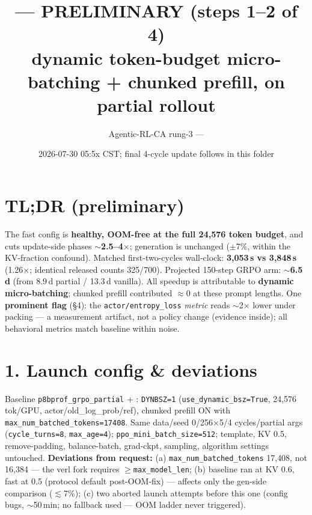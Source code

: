 \documentclass[10pt]{article}
\title{\vspace{-1.4em}\code{p8bprof\_grpo\_fast} --- PRELIMINARY (steps 1--2 of 4)\\
\large dynamic token-budget micro-batching + chunked prefill, on partial rollout\vspace{-0.5em}}
\author{Agentic-RL-CA rung-3 --- \code{sync-partial-rollout-poc}}
\date{2026-07-30 05:5x CST; final 4-cycle update follows in this folder}
\newcommand{\code}[1]{\texttt{\small #1}}
\newcommand{\flag}[1]{\textcolor{red!70!black}{\textbf{#1}}}
\begin{document}
\maketitle\vspace{-1.8em}

\section*{TL;DR (preliminary)}
The fast config is \textbf{healthy, OOM-free at the full 24{,}576 token budget}, and cuts
update-side phases $\sim$\textbf{2.5--4$\times$}; generation is unchanged ($\pm$7\%, within the
KV-fraction confound). Matched first-two-cycles wall-clock: \textbf{3{,}053\,s vs 3{,}848\,s}
(1.26$\times$; identical released counts 325/700). Projected 150-step GRPO arm:
\textbf{$\sim$6.5\,d} (from 8.9\,d partial / 13.3\,d vanilla). All speedup is attributable to
\textbf{dynamic micro-batching}; chunked prefill contributed $\approx$0 at these prompt lengths.
One \flag{prominent flag} (\S4): the \code{actor/entropy\_loss} \emph{metric} reads
$\sim$2$\times$ lower under packing --- a measurement artifact, not a policy change (evidence
inside); all behavioral metrics match baseline within noise.

\section*{1. Launch config \& deviations}
Baseline \code{p8bprof\_grpo\_partial} + : \code{DYNBSZ=1} (\code{use\_dynamic\_bsz=True},
24{,}576 tok/GPU, actor/old\_log\_prob/ref), chunked prefill ON with
\code{max\_num\_batched\_tokens=17408}. Same data/seed 0/256$\times$5/4 cycles/partial args
(\code{cycle\_turns=8}, \code{max\_age=4}); \code{ppo\_mini\_batch\_size=512}; template, KV 0.5,
remove-padding, balance-batch, grad-ckpt, sampling, algorithm settings untouched.
\textbf{Deviations from request:} (a) \code{max\_num\_batched\_tokens} 17{,}408, not 16{,}384 ---
the verl fork requires $\ge$\code{max\_model\_len}; (b) baseline ran at KV 0.6, fast at 0.5
(protocol default post-OOM-fix) --- affects only the gen-side comparison ($\lesssim$7\%);
(c) two aborted launch attempts before this one (config bugs, $\sim$50\,min; no fallback used ---
OOM ladder never triggered).
\end{document}
